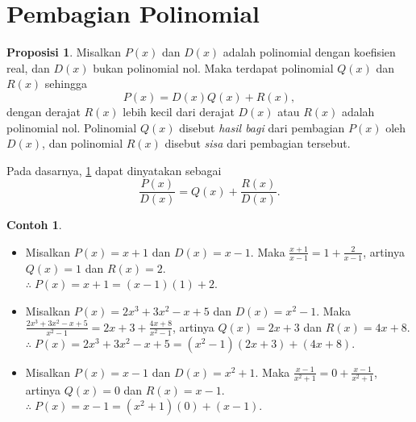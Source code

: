 \documentclass[aspectratio=169]{beamer}
\theoremstyle{definition}
\newtheorem{proposisi}{Proposisi}
\newtheorem{contoh}{Contoh}
\newcommand{\myref}[1]{\hyperref[#1]{\nameCref{#1} \ref*{#1}}}
\begin{document}
\section{Pembagian Polinomial}
\begin{frame}{\insertsection}
  \begin{proposisi}
    Misalkan $P(x)$ dan $D(x)$ adalah polinomial dengan koefisien real, dan $D(x)$ bukan polinomial nol. Maka terdapat polinomial $Q(x)$ dan $R(x)$ sehingga\label{prop:pembagian_polinom}
    \[
      P(x) = D(x) Q(x) + R(x),
    \]
    dengan derajat $R(x)$ lebih kecil dari derajat $D(x)$ atau $R(x)$ adalah polinomial nol. Polinomial $Q(x)$ disebut \textit{hasil bagi} dari pembagian $P(x)$ oleh $D(x)$, dan polinomial $R(x)$ disebut \textit{sisa} dari pembagian tersebut.
  \end{proposisi}
  Pada dasarnya, \myref{prop:pembagian_polinom} dapat dinyatakan sebagai
  \[
    \frac{P(x)}{D(x)} = Q(x) + \frac{R(x)}{D(x)}.
  \]
\end{frame}
\begin{frame}{\insertsection}
  \begin{contoh}
    \begin{itemize}
      \item Misalkan $P(x) = x + 1$ dan $D(x) = x - 1$. Maka
            $\frac{x+1}{x-1} = 1 + \frac{2}{x-1}$, artinya $Q(x) = 1$ dan $R(x) = 2$.\\
            $\therefore\; P(x) = x + 1 = (x - 1)(1) + 2$.
      \item Misalkan $P(x) = 2x^3 + 3x^2 - x + 5$ dan $D(x) = x^2 - 1$. Maka
            $\frac{2x^3 + 3x^2 - x + 5}{x^2 - 1} = 2x + 3 + \frac{4x + 8}{x^2 - 1}$, artinya $Q(x) = 2x + 3$ dan $R(x) = 4x + 8$.\\
            $\therefore\; P(x) = 2x^3 + 3x^2 - x + 5 = (x^2 - 1)(2x + 3) + (4x + 8)$.
      \item Misalkan $P(x) = x - 1$ dan $D(x) = x^2 + 1$. Maka
            $\frac{x-1}{x^2 + 1} = 0 + \frac{x-1}{x^2 + 1}$, artinya $Q(x) = 0$ dan $R(x) = x-1$.\\
            $\therefore\; P(x) = x - 1 = (x^2 + 1)(0) + (x - 1)$.
    \end{itemize}
  \end{contoh}
\end{frame}
\end{document}
